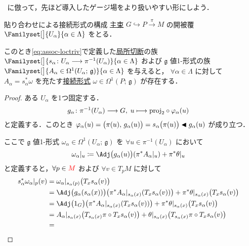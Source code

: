 \documentclass[TQFT_main]{subfiles}
\begin{document}
~\cite[第10章-1]{Nakahara2018topo2}に倣って，先ほど導入したゲージ場をより扱いやすい形にしよう．

\begin{mytheo}[label=thm:local-connection]{貼り合わせによる接続形式の構成}
    \hyperref[def.PFD]{主束} $G \hookrightarrow P \xrightarrow{\pi} M$ の開被覆 $\Familyset[\big]{U_\alpha}{\alpha \in \Lambda}$ をとる．
    
    このとき\eqref{eq:assoc-loctriv}で定義した\hyperref[def.section]{局所切断}の族 $\Familyset[\big]{s_\alpha \colon U_\alpha \lto \pi^{-1}(U_\alpha)}{\alpha \in \Lambda}$ および $\mathfrak{g}$ 値1-形式の族 $\Familyset[\big]{A_\alpha \in \Omega^1(U_\alpha;\, \mathfrak{g})}{\alpha \in \Lambda}$ を与えると，
    $\forall \alpha \in \Lambda$ に対して $A_\alpha = s_\alpha^* \omega$ を充たす\hyperref[def:connection]{接続形式} $\omega \in \Omega^1(P;\, \mathfrak{g})$ が存在する．
\end{mytheo}

\begin{proof}
    ある $U_\alpha$ を1つ固定する．
    \begin{align}
        g_\alpha \colon \pi^{-1}(U_\alpha) \longrightarrow G,\; u \longmapsto \mathrm{proj}_2 \circ \varphi_\alpha (u)
    \end{align}
    と定義する．このとき $\varphi_\alpha(u) = \bigl( \pi(u),\, g_\alpha(u)\bigr) = s_\alpha \bigl(\pi(u)\bigr) \blacktriangleleft g_\alpha(u)$ が成り立つ．
    
    ここで $\mathfrak{g}$ 値1-形式 $\omega_\alpha \in \Omega^1(U_\alpha;\, \mathfrak{g})$ を $\forall u \in \pi^{-1}(U_\alpha)$ において
    \begin{align}
        \omega_\alpha|_u \coloneqq \Adj \bigl( g_\alpha(u) \bigr)(\pi^* A_\alpha|_u) + \pi^*\theta|_u
    \end{align}
    と定義すると，$\forall p \in \textcolor{red}{M}$ および $\forall v \in T_{p} M$ に対して
    \begin{align}
        s_\alpha^* \omega_\alpha|_{p}(v)
        &= \omega_\alpha|_{s_\alpha(p)} \bigl( T_{x} s_\alpha (v) \bigr) \\
        &= \Adj \bigl( g_\alpha(s_\alpha(x)) \bigr)\bigl(\pi^* A_\alpha|_{s_\alpha(x)}(T_x s_\alpha(v))\bigr) + \pi^*\theta|_{s_\alpha(x)}\bigl( T_{x} s_\alpha (v) \bigr) \\
        &= \Adj \bigl( 1_G \bigr)\bigl(\pi^* A_\alpha|_{s_\alpha(x)}(T_x s_\alpha(v))\bigr) + \pi^*\theta|_{s_\alpha(x)}\bigl( T_{x} s_\alpha (v) \bigr) \\
        &= A_\alpha|_{s_\alpha(x)}\bigl(T_{s_\alpha(x)} \pi \circ T_x s_\alpha(v)\bigr)+ \theta|_{s_\alpha(x)}\bigl( T_{s_\alpha(x)}\pi \circ T_{x} s_\alpha (v) \bigr) \\
        &=
    \end{align}
    
\end{proof}
\end{document}
